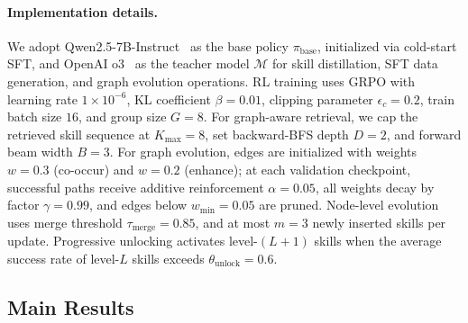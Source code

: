 \paragraph{Implementation details.}
We adopt Qwen2.5-7B-Instruct~\citep{bai2023qwen} as the base policy $\pi_{\text{base}}$, initialized via cold-start SFT, and OpenAI o3~\citep{openai2025o3} as the teacher model $\mathcal{M}$ for skill distillation, SFT data generation, and graph evolution operations. RL training uses GRPO with learning rate $1 \times 10^{-6}$, KL coefficient $\beta=0.01$, clipping parameter $\epsilon_c=0.2$, train batch size $16$, and group size $G=8$. For graph-aware retrieval, we cap the retrieved skill sequence at $K_{\max}=8$, set backward-BFS depth $D=2$, and forward beam width $B=3$. For graph evolution, edges are initialized with weights $w=0.3$ (co-occur) and $w=0.2$ (enhance); at each validation checkpoint, successful paths receive additive reinforcement $\alpha=0.05$, all weights decay by factor $\gamma=0.99$, and edges below $w_{\min}=0.05$ are pruned. Node-level evolution uses merge threshold $\tau_{\text{merge}}=0.85$, and at most $m=3$ newly inserted skills per update. Progressive unlocking activates level-$(L{+}1)$ skills when the average success rate of level-$L$ skills exceeds $\theta_{\text{unlock}}=0.6$.

\subsection{Main Results}

